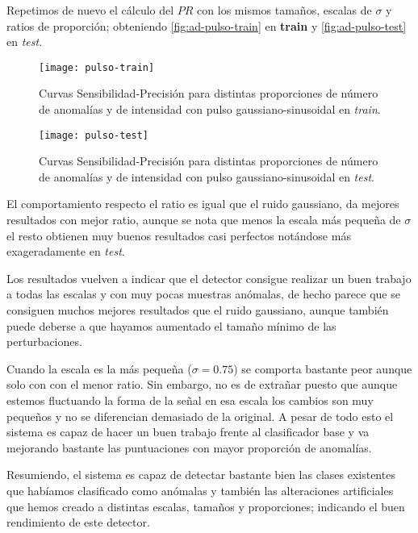 Repetimos de nuevo el cálculo del $PR$ con los mismos tamaños, escalas de $\sigma$ y ratios de proporción; obteniendo \autoref{fig:ad-pulso-train} en \textbf{train} y \autoref{fig:ad-pulso-test} en \emph{test}.

\begin{figure}[htpb]
  \centering
  \texttt{[image: pulso-train]}
  \caption{Curvas Sensibilidad-Precisión para distintas proporciones de número de anomalías y de intensidad con pulso gaussiano-sinusoidal en \emph{train}.}
  \label{fig:ad-pulso-train}
\end{figure}

\begin{figure}[htpb]
  \centering
  \texttt{[image: pulso-test]}
  \caption{Curvas Sensibilidad-Precisión para distintas proporciones de número de anomalías y de intensidad con pulso gaussiano-sinusoidal en \emph{test}.}
  \label{fig:ad-pulso-test}
\end{figure}

El comportamiento respecto el ratio es igual que el ruido gaussiano, da mejores resultados con mejor ratio, aunque se nota que menos la escala más pequeña de $\sigma$ el resto obtienen muy buenos resultados casi perfectos notándose más exageradamente en \emph{test}.

Los resultados vuelven a indicar que el detector consigue realizar un buen trabajo a todas las escalas y con muy pocas muestras anómalas, de hecho parece que se consiguen muchos mejores resultados que el ruido gaussiano, aunque también puede deberse a que hayamos aumentado el tamaño mínimo de las perturbaciones.

Cuando la escala es la más pequeña ($\sigma = 0.75$) se comporta bastante peor aunque solo con con el menor ratio. Sin embargo, no es de extrañar puesto que aunque estemos fluctuando la forma de la señal en esa escala los cambios son muy pequeños y no se diferencian demasiado de la original. A pesar de todo esto el sistema es capaz de hacer un buen trabajo frente al clasificador base y va mejorando bastante las puntuaciones con mayor proporción de anomalías.

Resumiendo, el sistema es capaz de detectar bastante bien las clases existentes que habíamos clasificado como anómalas y también las alteraciones artificiales que hemos creado a distintas escalas, tamaños y proporciones; indicando el buen rendimiento de este detector.

